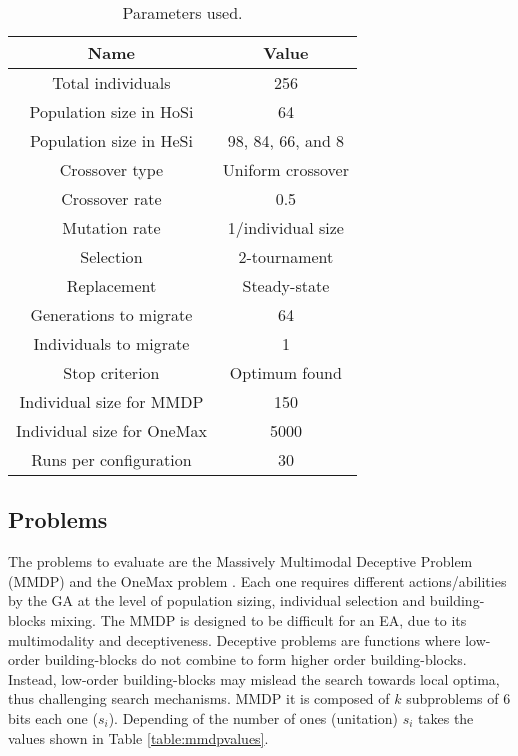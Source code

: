 \documentclass[final,1p,times]{elsarticle}
\begin{document}
\begin{table}
\centering
\caption{Parameters used.}
\begin{tabular}{|c|c|} \hline
Name & Value\\ \hline
Total individuals & 256\\ \hline
Population size in HoSi & 64 \\ \hline
Population size in HeSi & 98, 84, 66, and 8\\ \hline
Crossover type & Uniform crossover \\ \hline
Crossover rate & 0.5\\ \hline
Mutation rate & 1/individual size\\ \hline
Selection & 2-tournament \\ \hline
Replacement & Steady-state\\ \hline
Generations to migrate & 64 \\ \hline
Individuals to migrate & 1 \\ \hline
Stop criterion & Optimum found \\ \hline
Individual size for MMDP & 150 \\ \hline
Individual size for OneMax & 5000 \\ \hline
Runs per configuration & 30 \\ 

\hline\end{tabular}
\label{table:parameters}
\end{table}

\subsection{Problems}
The problems to evaluate are the Massively Multimodal Deceptive Problem (MMDP) \cite{goldberg92massive} and the OneMax problem \cite{ONEMAX}. Each one requires different actions/abilities by the GA at the level of population sizing, individual selection and building-blocks mixing. The MMDP
 is designed to be difficult for an EA, due to
its multimodality and deceptiveness. Deceptive problems are functions where low-order building-blocks do not combine to form higher order building-blocks. Instead, low-order building-blocks may mislead the search towards local optima, thus challenging search mechanisms. MMDP it is composed of $k$ subproblems of 6 bits each one ($s_i$). Depending of
the number of ones (unitation) $s_i$ takes the values shown in Table \ref{table:mmdpvalues}.  
\end{document}
